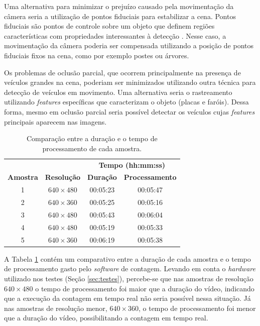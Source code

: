 Uma alternativa para minimizar o prejuízo causado pela movimentação da câmera seria a utilização de pontos fiduciais para estabilizar a cena. Pontos fiduciais são pontos de controle sobre um objeto que definem regiões características com propriedades interessantes à detecção \citep{2012fiduciais}. Nesse caso, a movimentação da câmera poderia ser compensada utilizando a posição de pontos fiduciais fixos na cena, como por exemplo postes ou árvores.

Os problemas de oclusão parcial, que ocorrem principalmente na presença de veículos grandes na cena, poderiam ser minimizados utilizando outra técnica para detecção de veículos em movimento. Uma alternativa seria o rastreamento utilizando \textit{features} específicas que caracterizam o objeto (placas e faróis). Dessa forma, mesmo em oclusão parcial seria possível detectar os veículos cujas \textit{features} principais aparecem nas imagens.

\begin{table}[ht]
  \caption{Comparação entre a duração e o tempo de processamento de cada amostra.}
  \label{tab:resultados_tempo}
  \begin{center}
    \begin{tabular}{cccc}
    \toprule
    \multicolumn{2}{c}{} & \multicolumn{2}{c}{\textbf{Tempo (hh:mm:ss)}} \\
    \cline{3-4}
    \textbf{Amostra} & \textbf{Resolução} & \textbf{Duração} & \textbf{Processamento} \\
    \midrule
      1 & $ 640\times 480 $ & 00:05:23 & 00:05:47 \\
      2 & $ 640\times 360 $ & 00:05:25 & 00:05:16 \\
      3 & $ 640\times 480 $ & 00:05:43 & 00:06:04 \\
      4 & $ 640\times 480 $ & 00:05:19 & 00:05:33 \\
      5 & $ 640\times 360 $ & 00:06:19 & 00:05:38 \\
    \bottomrule
    \end{tabular}
  \end{center}
\end{table}

A Tabela \ref{tab:resultados_tempo} contém um comparativo entre a duração de cada amostra e o tempo de processamento gasto pelo \textit{software} de contagem. Levando em conta o \textit{hardware} utilizado nos testes (Seção \ref{sec:testes}), percebe-se que nas amostras de resolução $640\times 480$ o tempo de processamento foi maior que a duração do vídeo, indicando que a execução da contagem em tempo real não seria possível nessa situação. Já nas amostras de resolução menor, $640\times 360$, o tempo de processamento foi menor que a duração do vídeo, possibilitando a contagem em tempo real.

